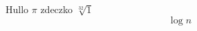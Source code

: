 \documentclass{article}
\begin{document}
Hullo $\pi$ zdeczko $\sqrt[32]{1}$
\[\log n\]
\end{document}
